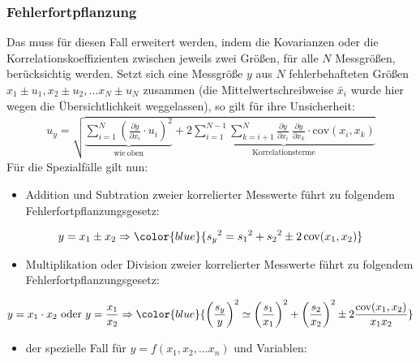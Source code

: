 \documentclass[letterpaper,10pt,english]{jupyterBook}
\begin{document}
\subsubsection{Fehlerfortpflanzung}
\label{\detokenize{content/1_Fehlerfortpflanzung:fehlerfortpflanzung}}
\sphinxAtStartPar
Das  muss für diesen Fall erweitert werden, indem die Kovarianzen oder die Korrelationskoeffizienten zwischen jeweils zwei Größen, für alle \(N\) Messgrößen, berücksichtig werden.
Setzt sich eine Messgröße \(y\) aus \(N\) fehlerbehafteten Größen \(x_1 \pm u_1, x_2 \pm u_2, ...  x_N \pm u_N\) zusammen (die Mittelwertschreibweise \(\bar x_i\) wurde hier wegen die Übersichtlichkeit weggelassen), so gilt für ihre Unsicherheit:
\begin{equation*}
\begin{split}u_y=\sqrt{\underbrace{\sum_{i=1}^N\left(\frac{\partial y}{\partial x_i}\cdot u_i\right)^2}_{\mathrm{wie~oben}}+ 2\underbrace{\sum_{i=1}^{N-1}\sum_{k=i+1}^N\frac{\partial y}{\partial x_i}\ \frac{\partial y}{\partial x_k}\cdot \mathrm{cov}(x_i, x_k)}_{\mathrm{Korrelationsterme}}}\end{split}
\end{equation*}
\sphinxAtStartPar
Für die Spezialfälle gilt nun:
\begin{itemize}
\item {} 
\sphinxAtStartPar
Addition und Subtration zweier korrelierter Messwerte führt zu folgendem Fehlerfortpflanzungsgesetz:

\end{itemize}
\begin{equation*}
\begin{split}y=x_1 \pm x_2 \Rightarrow \color{blue}{
   {s_y}^2 = {s_1}^2 + {s_2}^2 \pm 2\, \mathrm{cov}(x_1,x_2) } \end{split}
\end{equation*}\begin{itemize}
\item {} 
\sphinxAtStartPar
Multiplikation oder Division zweier korrelierter Messwerte führt zu folgendem Fehlerfortpflanzungsgesetz:

\end{itemize}
\begin{equation*}
\begin{split}y=x_1 \cdot  x_2 {\rm ~oder~} y = \frac{x_1}{x_2} \Rightarrow \color{blue} {
    \left( \frac{s_y} {y} \right)^2 \simeq 
    \left( \frac{s_1} {x_1} \right)^2  
  + \left( \frac{s_2} {x_2} \right)^2
   \pm 2\frac{\mathrm{cov}(x_1,x_2)}{x_1 x_2} }\end{split}
\end{equation*}\begin{itemize}
\item {} 
\sphinxAtStartPar
der spezielle Fall für \(y = f(x_1, x_2, ... x_n)\) und  Variablen:

\end{itemize}
\end{document}
